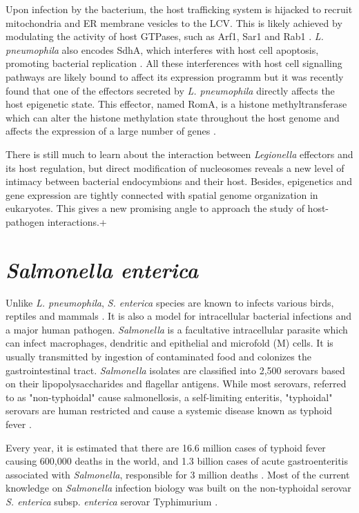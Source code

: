 Upon infection by the bacterium, the host trafficking system is hijacked to recruit mitochondria and ER membrane vesicles to the LCV. This is likely achieved by modulating the activity of host GTPases, such as Arf1, Sar1 and Rab1 \cite{Isberg2009}. \textit{L. pneumophila} also encodes SdhA,  which interferes with host cell apoptosis, promoting bacterial replication \cite{Isberg2009}. All these interferences with host cell signalling pathways are likely bound to affect its expression programm but it was recently found that one of the effectors secreted by \textit{L. pneumophila} directly affects the host epigenetic state. This effector, named RomA, is a histone methyltransferase which can alter the histone methylation state throughout the host genome and affects the expression of a large number of genes \cite{Rolando2013}.

There is still much to learn about the interaction between \textit{Legionella} effectors and its host regulation, but direct modification of nucleosomes reveals a new level of intimacy between bacterial endocymbions and their host. Besides, epigenetics and gene expression are tightly connected with spatial genome organization in eukaryotes. This gives a new promising angle to approach the study of host-pathogen interactions.+


\section{\textit{Salmonella enterica}}

Unlike \textit{L. pneumophila}, \textit{S. enterica} species are known to infects various birds, reptiles and mammals \cite{Uzzau2000}. It is also a model for intracellular bacterial infections and a major human pathogen. \textit{Salmonella} is a facultative intracellular parasite which can infect macrophages, dendritic and epithelial and microfold (M) cells. It is usually transmitted by ingestion of contaminated food and colonizes the gastrointestinal tract. \textit{Salmonella} isolates are classified into 2,500 serovars based on their lipopolysaccharides and flagellar antigens. While most serovars, referred to as "non-typhoidal" cause salmonellosis, a self-limiting enteritis, "typhoidal" serovars are human restricted and cause a systemic disease known as typhoid fever \cite{Larock2015}.

Every year, it is estimated that there are 16.6 million cases of typhoid fever causing 600,000 deaths in the world, and 1.3 billion cases of acute gastroenteritis associated with \textit{Salmonella}, responsible for 3 million deaths \cite{Pang1995}. Most of the current knowledge on \textit{Salmonella} infection biology was built on the non-typhoidal serovar \textit{S. enterica} subsp. \textit{enterica} serovar Typhimurium \cite{Larock2015}. 

